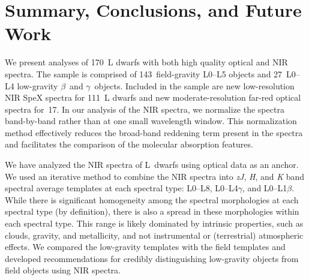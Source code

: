 \documentclass[modern,trackchanges]{aastex61}
\newcommand{\sample}{170}
\newcommand{\optField}{143}
\newcommand{\optLowG}{27}
\newcommand{\NewOptObjects}{17} %
\newcommand{\NewPrismObjects}{111} %
\begin{document}
\section{Summary, Conclusions, and Future Work}
\label{sec:summary}
We present analyses of \sample~L dwarfs with both high quality optical and NIR spectra.
The sample is comprised of \optField~field-gravity L0--L5 objects and \optLowG~L0--L4 low-gravity $\beta$~and $\gamma$~objects.
Included in the sample are new low-resolution NIR SpeX spectra for \NewPrismObjects~L dwarfs and new moderate-resolution far-red optical spectra for~\NewOptObjects.
In our analysis of the NIR spectra, we normalize the spectra band-by-band rather than at one small wavelength window.
This normalization method effectively reduces the broad-band reddening term present in the spectra and facilitates the comparison of the molecular absorption features.

We have analyzed the NIR spectra of L~dwarfs using optical data as an anchor.
We used an iterative method to combine the NIR spectra into \emph{zJ}, \emph{H}, and \emph{K} band spectral average templates at each spectral type: L0--L8, L0--L4$\gamma$, and L0--L1$\beta$.
While there is significant homogeneity among the spectral morphologies at each spectral type (by definition), there is also a spread in these morphologies within each spectral type.
This range is likely dominated by intrinsic properties, such as clouds, gravity, and metallicity, and not instrumental or (terrestrial) atmospheric effects.
We compared the low-gravity templates with the field templates and developed recommendations for credibly distinguishing low-gravity objects from field objects using NIR spectra.
\end{document}
